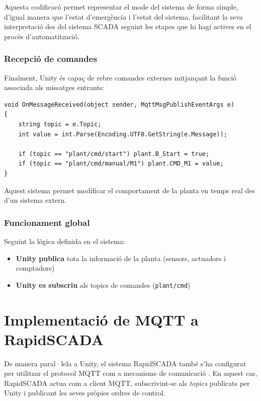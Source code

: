 \documentclass[12pt,a4paper]{report}
\begin{document}
Aquesta codificacó permet representar el mode del sistema de forma simple, d'igual manera que l'estat d'emergència i l'estat del sistema, facilitant la seva interpretació des del sistema SCADA seguint les etapes que hi hagi actives en el procès d'automatització.

\subsubsection{Recepció de comandes}

Finalment, Unity és capaç de rebre comandes externes mitjançant la funció associada als missatges entrants:

\begin{lstlisting}[language=CSharp, caption=Gestió de comandes]
void OnMessageReceived(object sender, MqttMsgPublishEventArgs e)
{
    string topic = e.Topic;
    int value = int.Parse(Encoding.UTF8.GetString(e.Message));

    if (topic == "plant/cmd/start") plant.B_Start = true;
    if (topic == "plant/cmd/manual/M1") plant.CMD_M1 = value;
}
\end{lstlisting}

Aquest sistema permet modificar el comportament de la planta en temps real des d'un sistema extern.

\subsubsection{Funcionament global}

Seguint la lògica definida en el sistema:

\begin{itemize}
    \item \textbf{Unity publica} tota la informació de la planta (sensors, actuadors i comptadors)
    \item \textbf{Unity es subscriu} als topics de comandes (\texttt{plant/cmd})
\end{itemize}


\section{Implementació de MQTT a RapidSCADA}

De manera paral·lela a Unity, el sistema RapidSCADA també s'ha configurat per utilitzar el protocol MQTT com a mecanisme de comunicació \cite{RapidScadaVideos}. En aquest cas, RapidSCADA actua com a client MQTT, subscrivint-se als \textit{topics} publicats per Unity i publicant les seves pròpies ordres de control.
\end{document}
